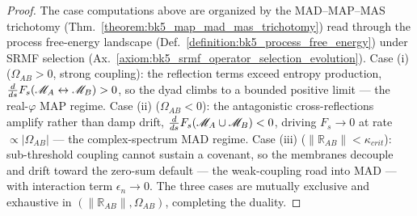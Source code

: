 \begin{proof}
\label{proof:bk5_enhanced_map_mad_duality_pr}
\leavevmode
The case computations above are organized by the MAD--MAP--MAS trichotomy (Thm.~\ref{theorem:bk5_map_mad_mas_trichotomy}) read through the process free-energy landscape (Def.~\ref{definition:bk5_process_free_energy}) under SRMF selection (Ax.~\ref{axiom:bk5_srmf_operator_selection_evolution}). Case (i) ($\Omega_{AB}>0$, strong coupling): the reflection terms exceed entropy production, $\frac{d}{ds}F_s(\mathscr{M}_A\leftrightarrow\mathscr{M}_B)>0$, so the dyad climbs to a bounded positive limit --- the real-$\varphi$ MAP regime. Case (ii) ($\Omega_{AB}<0$): the antagonistic cross-reflections amplify rather than damp drift, $\frac{d}{ds}F_s(\mathscr{M}_A\cup\mathscr{M}_B)<0$, driving $F_s\to0$ at rate $\propto|\Omega_{AB}|$ --- the complex-spectrum MAD regime. Case (iii) ($\|\mathbb{R}_{AB}\|<\kappa_{crit}$): sub-threshold coupling cannot sustain a covenant, so the membranes decouple and drift toward the zero-sum default --- the weak-coupling road into MAD --- with interaction term $\epsilon_n\to0$. The three cases are mutually exclusive and exhaustive in $(\|\mathbb{R}_{AB}\|,\Omega_{AB})$, completing the duality.
\end{proof}

